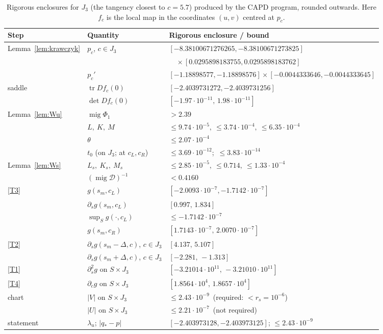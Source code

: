 \documentclass[11pt]{amsart}
\theoremstyle{definition}
\theoremstyle{remark}
\newcommand{\mig}{\operatorname{mig}}
\newcommand{\Dh}{\mathcal{D}}
\begin{document}
\begin{table}[t]
\centering
\footnotesize
\begin{tabular}{@{}lll@{}}
\toprule
Step & Quantity & Rigorous enclosure / bound\\
\midrule
Lemma~\ref{lem:krawczyk} & $p_c$, $c\in J_3$ & $[-8.38100671276265,-8.38100671273825]$\\
& & $\quad\times[0.0295898183755,0.0295898183762]$\\
& $p_c'$ & $[-1.18898577,-1.18898576]\times[-0.0044333646,-0.0044333645]$\\
saddle & $\operatorname{tr}Df_c(0)$ & $[-2.4039731272,-2.4039731256]$\\
& $\det Df_c(0)$ & $[-1.97\cdot10^{-11},\,1.98\cdot10^{-11}]$\\
Lemma~\ref{lem:Wu} & $\mig\Phi_1$ & $>2.39$\\
& $L,\ K,\ M$ & $\le9.74\cdot10^{-5},\ \le3.74\cdot10^{-4},\ \le6.35\cdot10^{-4}$\\
& $\theta$ & $\le2.07\cdot10^{-4}$\\
& $t_0$ (on $J_3$; at $c_L,c_R$) & $\le3.69\cdot10^{-12}$;\ $\le3.83\cdot10^{-14}$\\
Lemma~\ref{lem:Ws} & $L_s,\ K_s,\ M_s$ & $\le2.85\cdot10^{-5},\ \le0.714,\ \le1.33\cdot10^{-4}$\\
& $(\mig\Dh)^{-1}$ & $<0.4160$\\
\ref{T3} & $g(s_m,c_L)$ & $[-2.0093\cdot10^{-7},-1.7142\cdot10^{-7}]$\\
& $\partial_sg(s_m,c_L)$ & $[0.997,\,1.834]$\\
& $\sup_Sg(\cdot,c_L)$ & $\le-1.7142\cdot10^{-7}$\\
& $g(s_m,c_R)$ & $[1.7143\cdot10^{-7},\,2.0070\cdot10^{-7}]$\\
\ref{T2} & $\partial_sg(s_m-\Delta,c)$, $c\in J_3$ & $[4.137,\,5.107]$\\
& $\partial_sg(s_m+\Delta,c)$, $c\in J_3$ & $[-2.281,\,-1.313]$\\
\ref{T1} & $\partial_s^2g$ on $S\times J_3$ & $[-3.21014\cdot10^{11},\,-3.21010\cdot10^{11}]$\\
\ref{T4} & $\partial_cg$ on $S\times J_3$ & $[1.8564\cdot10^{4},\,1.8657\cdot10^{4}]$\\
chart & $|V|$ on $S\times J_3$ & $\le2.43\cdot10^{-9}$\ (required: $<r_s=10^{-6}$)\\
& $|U|$ on $S\times J_3$ & $\le2.21\cdot10^{-7}$\ (not required)\\
statement & $\lambda_u$; $|q_*-p|$ & $[-2.403973128,-2.403973125]$; $\le2.43\cdot10^{-9}$\\
\bottomrule
\end{tabular}
\vspace{4pt}
\caption{Rigorous enclosures for $J_3$ (the tangency closest to $c=5.7$) produced by the CAPD program, rounded
outwards. Here $f_c$ is the local map in the coordinates $(u,v)$ centred at $p_c$.}
\label{tab:results}
\end{table}
\end{document}
